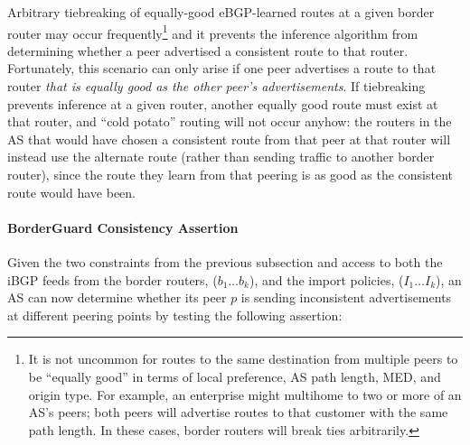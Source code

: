 Arbitrary tiebreaking of equally-good eBGP-learned routes at a given
border router may occur frequently\footnote{It is not uncommon for
routes to the same destination from multiple peers to be ``equally
good'' in terms of local preference, AS path length, MED, and origin
type.  For example, an enterprise might multihome to two or more of an AS's
peers; both peers will advertise routes to that customer with the same
path length.  In these cases, border routers will break ties
arbitrarily.} and it prevents the inference algorithm from determining
whether a peer advertised a consistent route to that router.
Fortunately, this scenario can only arise if one peer 
advertises a route to that router {\em that is equally good as the other
peer's advertisements}.  If tiebreaking prevents inference at a given router,
another equally good route must exist at that router, and ``cold
potato'' routing will not occur anyhow: the routers in the AS that would
have chosen a consistent route from that peer at that router will
instead use the alternate route (rather than sending traffic to another
border router), since the route they learn from that peering is as good
as the consistent route would have been.







\paragraph{BorderGuard Consistency Assertion}

Given the two constraints from the previous subsection and access to both
the iBGP feeds from the border routers, ($b_1 \ldots b_k$), and the import
policies, ($I_1 \ldots I_k$), an AS can now determine whether its peer $p$ is
sending inconsistent advertisements at different peering points by
testing the following assertion:


